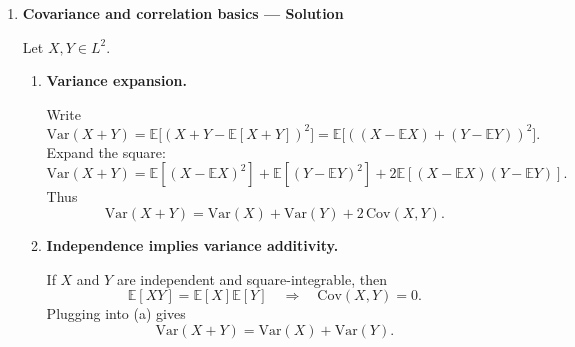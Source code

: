 \documentclass[11pt]{article}
\begin{document}
\begin{enumerate}
\begin{enumerate}[label=(\alph*)]
\[
\int_0^1\int_0^1 6x^2y\,dy\,dx
=
\int_0^1 6x^2\Big[\frac{y^2}{2}\Big]_{0}^{1}\,dx
=
\int_0^1 3x^2\,dx
=
3\Big[\frac{x^3}{3}\Big]_{0}^{1}
=1.
\]

\item \textbf{Compute marginals.}

For $x\in[0,1]$,
\[
f_X(x)=\int_0^1 6x^2y\,dy
=6x^2\cdot \frac12
=3x^2.
\]
For $y\in[0,1]$,
\[
f_Y(y)=\int_0^1 6x^2y\,dx
=6y\Big[\frac{x^3}{3}\Big]_0^1
=2y.
\]

\item \textbf{Independence.}

For $(x,y)\in[0,1]^2$,
\[
f_X(x)f_Y(y)=(3x^2)(2y)=6x^2y=f_{X,Y}(x,y),
\]
so $X$ and $Y$ are independent.

\item \textbf{Compute $\mathbb{E}[X]$, $\mathbb{E}[Y]$, and $\mathrm{Var}(X)$.}

Using marginals:
\[
\mathbb{E}[X]=\int_0^1 x\cdot 3x^2\,dx = 3\int_0^1 x^3\,dx=3\cdot \frac14=\frac34.
\]
\[
\mathbb{E}[Y]=\int_0^1 y\cdot 2y\,dy = 2\int_0^1 y^2\,dy=2\cdot \frac13=\frac23.
\]
Also
\[
\mathbb{E}[X^2]=\int_0^1 x^2\cdot 3x^2\,dx=3\int_0^1 x^4\,dx=3\cdot \frac15=\frac35.
\]
Hence
\[
\mathrm{Var}(X)=\mathbb{E}[X^2]-(\mathbb{E}[X])^2
=\frac35-\Big(\frac34\Big)^2
=\frac35-\frac{9}{16}
=\frac{48-45}{80}
=\frac{3}{80}.
\]
\end{enumerate}

\item \textbf{Covariance and correlation basics — Solution}

Let $X,Y\in L^2$.

\begin{enumerate}[label=(\alph*)]
\item \textbf{Variance expansion.}

Write
\[
\mathrm{Var}(X+Y)=\mathbb{E}\big[(X+Y-\mathbb{E}[X+Y])^2\big]
=\mathbb{E}\big[((X-\mathbb{E}X)+(Y-\mathbb{E}Y))^2\big].
\]
Expand the square:
\[
\mathrm{Var}(X+Y)
=
\mathbb{E}[(X-\mathbb{E}X)^2]
+
\mathbb{E}[(Y-\mathbb{E}Y)^2]
+
2\mathbb{E}[(X-\mathbb{E}X)(Y-\mathbb{E}Y)].
\]
Thus
\[
\mathrm{Var}(X+Y)=\mathrm{Var}(X)+\mathrm{Var}(Y)+2\,\mathrm{Cov}(X,Y).
\]

\item \textbf{Independence implies variance additivity.}

If $X$ and $Y$ are independent and square-integrable, then
\[
\mathbb{E}[XY]=\mathbb{E}[X]\mathbb{E}[Y]
\quad\Rightarrow\quad
\mathrm{Cov}(X,Y)=0.
\]
Plugging into (a) gives
\[
\mathrm{Var}(X+Y)=\mathrm{Var}(X)+\mathrm{Var}(Y).
\]


\end{enumerate}
\end{enumerate}
\end{document}
